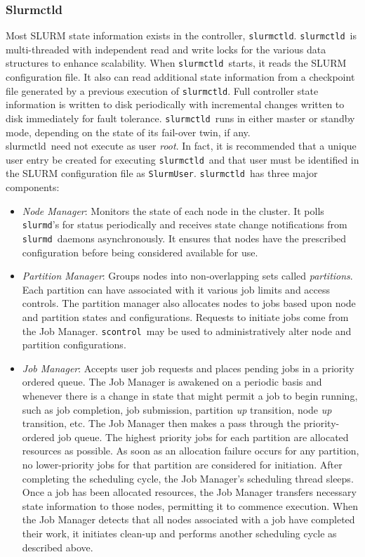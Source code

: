 \documentclass{article}
\newcommand{\scontrol}{{\tt scontrol}}
\newcommand{\slurmctld}{{\tt slurmctld}}
\newcommand{\slurmd}{{\tt slurmd}}
\begin{document}
\subsubsection{Slurmctld}

Most SLURM state information exists in the controller, {\tt slurmctld}.
\slurmctld\ is multi-threaded with independent read and write locks 
for the various data structures to enhance scalability. 
When \slurmctld\ starts, it reads the SLURM configuration file.  
It also can read additional state information
from a checkpoint file generated by a previous execution of {\tt slurmctld}.
Full controller state information is written to 
disk periodically with incremental changes written to disk immediately
for fault tolerance.  
\slurmctld\ runs in either master or standby mode, depending on the
state of its fail-over twin, if any.
\\slurmctld\ need not execute as user {\em root}. 
In fact, it is recommended that a unique user entry be created for 
executing \slurmctld\ and that user must be identified in the SLURM 
configuration file as {\tt SlurmUser}.
\slurmctld\ has three major components:

\begin{itemize}
\item {\em Node Manager}: Monitors the state of each node in
the cluster.  It polls {\tt slurmd}'s for status periodically and
receives state change notifications from \slurmd\ daemons asynchronously.
It ensures that nodes have the prescribed configuration before being 
considered available for use.

\item {\em Partition Manager}: Groups nodes into non-overlapping sets called
{\em partitions}. Each partition can have associated with it various job
limits and access controls.  The partition manager also allocates nodes
to jobs based upon node and partition states and configurations. Requests
to initiate jobs come from the Job Manager.  \scontrol\ may be used
to administratively alter node and partition configurations.

\item {\em Job Manager}: Accepts user job requests and places pending 
jobs in a priority ordered queue. 
The Job Manager is awakened on a periodic basis and whenever there
is a change in state that might permit a job to begin running, such
as job completion, job submission, partition {\em up} transition,
node {\em up} transition, etc.  The Job Manager then makes a pass
through the priority-ordered job queue. The highest priority jobs 
for each partition are allocated resources as possible. As soon as an 
allocation failure occurs for any partition, no lower-priority jobs for 
that partition are considered for initiation. 
After completing the scheduling cycle, the Job Manager's scheduling
thread sleeps.  Once a job has been allocated resources, the Job Manager
transfers necessary state information to those nodes, permitting it 
to commence execution.  When the Job Manager detects that
all nodes associated with a job have completed their work, it initiates
clean-up and performs another scheduling cycle as described above.

\end{itemize}
\end{document}
